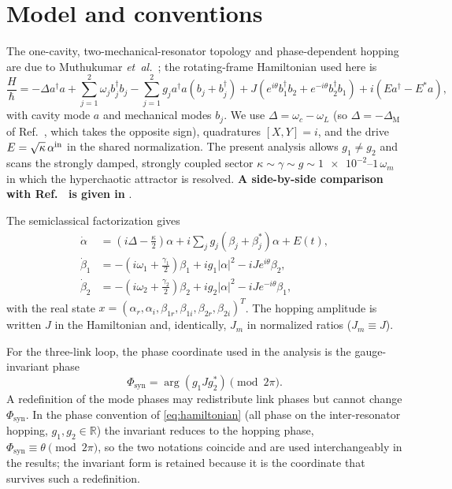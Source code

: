 \documentclass[preprint,numbers,a4paper]{elsarticle}
\begin{document}
\section{Model and conventions}

The one-cavity, two-mechanical-resonator topology and phase-dependent hopping are due to Muthukumar \emph{et~al.}~\cite{muthukumar2025doi}; the rotating-frame Hamiltonian used here is
\begin{equation}
\frac{H}{\hbar}=-\Delta a^\dagger a
+\sum_{j=1}^{2}\omega_j b_j^\dagger b_j
-\sum_{j=1}^{2}g_j a^\dagger a(b_j+b_j^\dagger)
+J\!\left(e^{i\theta}b_1^\dagger b_2+e^{-i\theta}b_2^\dagger b_1\right)
+i(Ea^\dagger-E^*a),
\label{eq:hamiltonian}
\end{equation}
with cavity mode $a$ and mechanical modes $b_j$. We use $\Delta=\omega_c-\omega_L$ (so $\Delta=-\Delta_{\mathrm M}$ of Ref.~\cite{muthukumar2025doi}, which takes the opposite sign), quadratures $[X,Y]=i$, and the drive $E=\sqrt{\kappa}\,\alpha^{\rm in}$ in the shared normalization. The present analysis allows $g_1\neq g_2$ and scans the strongly damped, strongly coupled sector $\kappa\sim\gamma\sim g\sim\num{1e-2}$--$\num{1}\,\omega_m$ in which the hyperchaotic attractor is resolved. \textbf{A side-by-side comparison with Ref.~\cite{muthukumar2025doi} is given in }.

The semiclassical factorization gives
\begin{align}
\dot\alpha &= \left(i\Delta-\frac{\kappa}{2}\right)\alpha
+i\sum_jg_j(\beta_j+\beta_j^*)\alpha+E(t),\\
\dot\beta_1 &= -\left(i\omega_1+\frac{\gamma_1}{2}\right)\beta_1
+ig_1|\alpha|^2-iJe^{i\theta}\beta_2,\\
\dot\beta_2 &= -\left(i\omega_2+\frac{\gamma_2}{2}\right)\beta_2
+ig_2|\alpha|^2-iJe^{-i\theta}\beta_1,
\label{eq:complex-eom}
\end{align}
with the real state $x=(\alpha_r,\alpha_i,\beta_{1r},\beta_{1i},\beta_{2r},\beta_{2i})^T$. The hopping amplitude is written $J$ in the Hamiltonian and, identically, $J_m$ in normalized ratios ($J_m\equiv J$).

For the three-link loop, the phase coordinate used in the analysis is the gauge-invariant phase
\begin{equation}
\Phi_{\mathrm{syn}}=\arg(g_1Jg_2^*)\pmod{2\pi}.
\label{eq:flux}
\end{equation}
A redefinition of the mode phases may redistribute link phases but cannot change $\Phi_{\mathrm{syn}}$. In the phase convention of \cref{eq:hamiltonian} (all phase on the inter-resonator hopping, $g_1,g_2\in\mathbb{R}$) the invariant reduces to the hopping phase, $\Phi_{\mathrm{syn}}\equiv\theta\pmod{2\pi}$, so the two notations coincide and are used interchangeably in the results; the invariant form is retained because it is the coordinate that survives such a redefinition.
\end{document}
